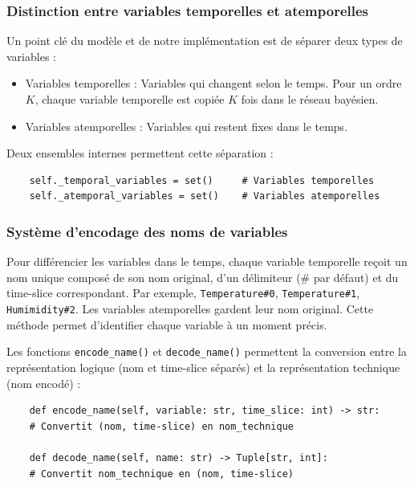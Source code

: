 \documentclass{article}
\begin{document}
\subsubsection{Distinction entre variables temporelles et atemporelles}

Un point clé du modèle et de notre implémentation est de séparer deux types de variables :

\begin{itemize}
    \item Variables temporelles : Variables qui changent selon le temps. Pour un ordre $K$, chaque variable
          temporelle est copiée $K$ fois dans le réseau bayésien.
    \item Variables atemporelles : Variables qui restent fixes dans le temps.
\end{itemize}

Deux ensembles internes permettent cette séparation :

\begin{lstlisting}
    self._temporal_variables = set()     # Variables temporelles
    self._atemporal_variables = set()    # Variables atemporelles
\end{lstlisting}


\subsubsection{Système d'encodage des noms de variables}

Pour différencier les variables dans le temps, chaque variable temporelle reçoit un nom unique composé de son nom
original, d'un délimiteur (\# par défaut)  et du time-slice correspondant. Par exemple, \texttt{Temperature\#0},
\texttt{Temperature\#1}, \texttt{Humimidity\#2}. Les variables atemporelles gardent leur nom original. Cette méthode
permet d'identifier chaque variable à un moment précis.

Les fonctions \texttt{encode\_name()} et \texttt{decode\_name()} permettent la conversion entre la représentation
logique (nom et time-slice séparés) et la représentation technique (nom encodé) :

\begin{lstlisting}    
    def encode_name(self, variable: str, time_slice: int) -> str:
    # Convertit (nom, time-slice) en nom_technique
    
    def decode_name(self, name: str) -> Tuple[str, int]:
    # Convertit nom_technique en (nom, time-slice)
\end{lstlisting}
\end{document}
